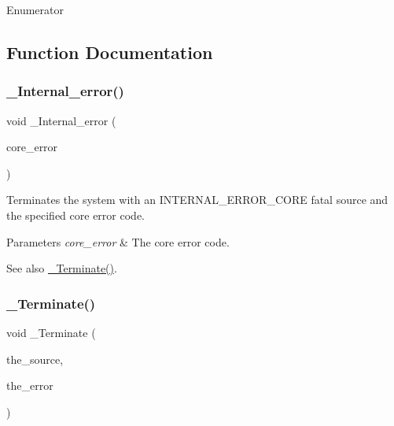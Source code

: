 \begin{DoxyEnumFields}{Enumerator}
\end{DoxyEnumFields}


\subsection{Function Documentation}
\mbox{\label{group__RTEMSScoreIntErr_ga092fa4be4bda2528754b494e901d3d2a}} 
\subsubsection{\texorpdfstring{\_Internal\_error()}{\_Internal\_error()}}
{\footnotesize\ttfamily void \+\_\+\+Internal\+\_\+error (\begin{DoxyParamCaption}\item[{\mbox{\hyperlink{group__RTEMSScoreIntErr_ga55d1197d1b88e797ec344be41aa4f5fe}{Internal\+\_\+errors\+\_\+\+Core\+\_\+list}}}]{core\+\_\+error }\end{DoxyParamCaption})}



Terminates the system with an I\+N\+T\+E\+R\+N\+A\+L\+\_\+\+E\+R\+R\+O\+R\+\_\+\+C\+O\+RE fatal source and the specified core error code. 


\begin{DoxyParams}{Parameters}
{\em core\+\_\+error} & The core error code.\\
\hline
\end{DoxyParams}
\begin{DoxySeeAlso}{See also}
\mbox{\hyperlink{group__RTEMSScoreIntErr_ga5102f2f0c5939020aa3b11d67afa84eb}{\+\_\+\+Terminate()}}. 
\end{DoxySeeAlso}
\mbox{\label{group__RTEMSScoreIntErr_ga5102f2f0c5939020aa3b11d67afa84eb}} 
\subsubsection{\texorpdfstring{\_Terminate()}{\_Terminate()}}
{\footnotesize\ttfamily void \+\_\+\+Terminate (\begin{DoxyParamCaption}\item[{\mbox{\hyperlink{group__RTEMSScoreIntErr_ga878b4de77df7d0b83d19609d4de42c26}{Internal\+\_\+errors\+\_\+\+Source}}}]{the\+\_\+source,  }\item[{Internal\+\_\+errors\+\_\+t}]{the\+\_\+error }\end{DoxyParamCaption})}



